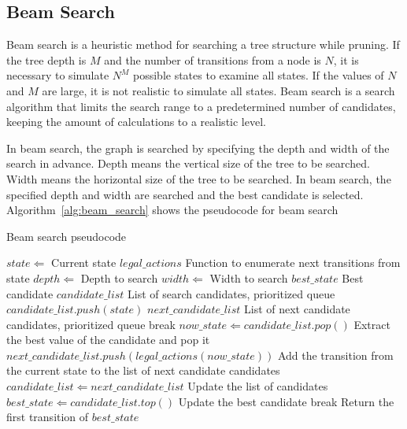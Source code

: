\subsection{Beam Search}
Beam search\cite{bisiani1992beam} is a heuristic method for searching a tree structure while pruning.
If the tree depth is $M$ and the number of transitions from a node is $N$,
it is necessary to simulate $N^M$ possible states to examine all states.
If the values of $N$ and $M$ are large,
it is not realistic to simulate all states.
Beam search is a search algorithm that limits the search range to a predetermined number of candidates,
keeping the amount of calculations to a realistic level.
\par
In beam search,
the graph is searched by specifying the depth and width of the search in advance.
Depth means the vertical size of the tree to be searched.
Width means the horizontal size of the tree to be searched.
In beam search, the specified depth and width are searched and the best candidate is selected.
Algorithm~\ref{alg:beam_search} shows the pseudocode for beam search
\begin{algorithm}[tbp]
\caption{Beam search pseudocode}
\label{alg:beam_search}
\begin{algorithmic}[1]
\Require $state \Leftarrow$ Current state
\Require $legal\_actions$ Function to enumerate next transitions from state
\Require $depth \Leftarrow$ Depth to search
\Require $width \Leftarrow$ Width to search
\State $best\_state$ Best candidate
\State $candidate\_list$ List of search candidates, prioritized queue
\State $candidate\_list.push(state)$
\State $next\_candidate\_list$ List of next candidate candidates, prioritized queue
\State break
\EndIf
\State $now\_state \Leftarrow candidate\_list.pop()$ Extract the best value of the candidate and pop it
\State $next\_candidate\_list.push(legal\_actions(now\_state))$ Add the transition from the current state to the list of next candidate candidates
\EndFor
\State $candidate\_list \Leftarrow next\_candidate\_list$ Update the list of candidates
\State $best\_state \Leftarrow candidate\_list.top()$ Update the best candidate
\State break
\EndIf
\EndFor
\State \Return Return the first transition of $best\_state$
\end{algorithmic}
\end{algorithm}

